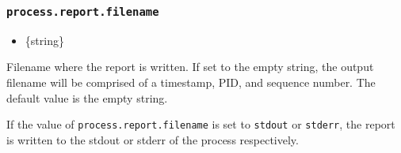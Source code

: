 \begin{Shaded}
\begin{Highlighting}[]
\OperatorTok{=} \NormalTok{(}\NormalTok{)}\OperatorTok{;}

\NormalTok{(}\SpecialCharTok{$\{}\SpecialCharTok{\}}\VerbatimStringTok{\textasciigrave{}}\NormalTok{)}\OperatorTok{;}
\end{Highlighting}
\end{Shaded}

\subsubsection{\texorpdfstring{\texttt{process.report.filename}}{process.report.filename}}\label{process.report.filename}

\begin{itemize}
\tightlist
\item
  \{string\}
\end{itemize}

Filename where the report is written. If set to the empty string, the
output filename will be comprised of a timestamp, PID, and sequence
number. The default value is the empty string.

If the value of \texttt{process.report.filename} is set to
\texttt{\textquotesingle{}stdout\textquotesingle{}} or
\texttt{\textquotesingle{}stderr\textquotesingle{}}, the report is
written to the stdout or stderr of the process respectively.

\begin{Shaded}
\begin{Highlighting}[]
 \OperatorTok{;}

\NormalTok{(}\SpecialCharTok{$\{}\SpecialCharTok{\}}\VerbatimStringTok{\textasciigrave{}}\NormalTok{)}\OperatorTok{;}
\end{Highlighting}
\end{Shaded}

\begin{Shaded}
\begin{Highlighting}[]
\OperatorTok{=} \NormalTok{(}\NormalTok{)}\OperatorTok{;}

\NormalTok{(}\SpecialCharTok{$\{}\SpecialCharTok{\}}\VerbatimStringTok{\textasciigrave{}}\NormalTok{)}\OperatorTok{;}
\end{Highlighting}
\end{Shaded}

